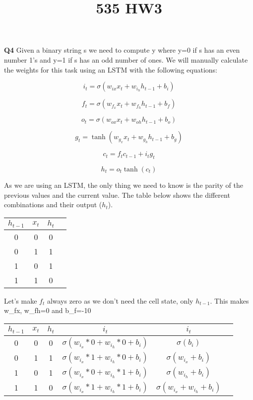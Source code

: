 \documentclass{article}
\title{535 HW3}
\begin{document}
\textbf{Q4} Given a binary string s we need to compute y where y=0 if s has an even number 1's and y=1 if s has an odd number of ones. We will manually calculate the weights for this task using an LSTM with the following equations:


\begin{equation}
    i_t = \sigma(w_{ix}x_t + w_{i_h}h_{t-1}+b_i) 
\end{equation}

\begin{equation}
    f_t = \sigma(w_{f_x}x_t + w_{f_h}h_{t-1}+b_f) 
\end{equation}

\begin{equation}
    o_t = \sigma(w_{ox}x_t + w_{oh}h_{t-1}+b_o) 
\end{equation}

\begin{equation}
    g_t = \tanh(w_{g_x}x_t + w_{g_h}h_{t-1}+b_g) 
\end{equation}

\begin{equation}
    c_t = f_t c_{t-1} + i_t g_t
\end{equation}

\begin{equation}
    h_t = o_t\tanh(c_t)
\end{equation}

As we are using an LSTM, the only thing we need to know is the parity of the previous values and the current value. The table below shows the different combinations and their output ($h_t$). 

\begin{center}\begin{tabular}{ |c|c|c|c| } 
\hline
$h_{t-1}$ & $x_t$ & $h_t$ \\
\hline
0 & 0 & 0 \\ 
0 & 1 & 1 \\ 
1 & 0 & 1 \\ 
1 & 1 & 0 \\ 
\hline
\end{tabular}\end{center}

Let's make $f_t$ always zero as we don't need the cell state, only $h_{t-1}$. This makes w_fx, w_fh=0 and b_f=-10


\begin{center}\begin{tabular}{ |c|c|c|c|c|c| } 
\hline
$h_{t-1}$ & $x_t$ & $h_t$ & $i_t$ & $i_t$ \\
\hline
0 & 0 & 0 & $\sigma(w_{i_x}*0 + w_{i_h}*0+b_i)$ &$\sigma(b_i)$ \\ 
0 & 1 & 1 & $\sigma(w_{i_x}*1 + w_{i_h}*0+b_i)$ & $\sigma(w_{i_x}+b_i)$ \\ 
1 & 0 & 1 & $\sigma(w_{i_x}*0 + w_{i_h}*1+b_i)$ & $\sigma(w_{i_h}+b_i)$ \\ 
1 & 1 & 0 & $\sigma(w_{i_x}*1 + w_{i_h}*1+b_i)$& $\sigma(w_{i_x} + w_{i_h}+b_i)$ \\ 
\hline
\end{tabular}\end{center}
\end{document}
